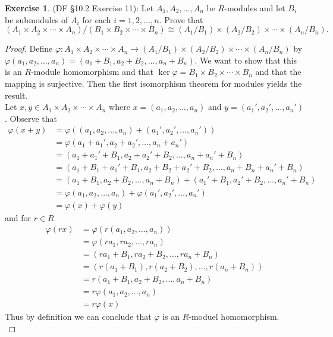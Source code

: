 \documentclass[8pt]{amsart}
\theoremstyle{plain}%
\theoremstyle{definition}
\newtheorem*{exercise}{Exercise}%
\theoremstyle{remark}
\numberwithin{equation}{section}
\begin{document}
\begin{exercise}
(DF \S 10.2 Exercise 11): Let $A_1, A_2, \ldots, A_n$ be $R$-modules and let $B_i$ be submodules of $A_i$ for each $i = 1, 2, \ldots, n$. Prove that $$(A_1 \times A_2 \times \cdots \times A_n)/(B_1 \times B_2 \times \cdots \times B_n) \cong (A_1/B_1) \times (A_2/B_2) \times \cdots \times (A_n/B_n).$$
	\begin{proof}
		Define $\varphi : A_1 \times A_2 \times \cdots \times A_n \to (A_1/B_1) \times (A_2/B_2) \times \cdots \times (A_n/B_n)$ by $\varphi(a_1, a_2, \ldots, a_n) = (a_1 + B_1, a_2 + B_2, \ldots, a_n + B_n)$. We want to show that this is an $R$-module homomorphism and that $\ker \varphi = B_1 \times B_2 \times \cdots \times B_n$ and that the mapping is surjective. Then the first isomorphism theorem for modules yields the result.\\

		Let $x, y \in A_1 \times A_2 \times \cdots \times A_n$ where $x = (a_1, a_2, \ldots, a_n)$ and $y = (a_1', a_2', \ldots, a_n')$. Observe that
		\begin{align*}
			\varphi(x + y) &= \varphi((a_1, a_2, \ldots, a_n) + (a_1', a_2', \ldots, a_n'))\\
			&= \varphi(a_1 + a_1', a_2 + a_2', \ldots, a_n + a_n')\\
			&= (a_1 + a_1' + B_1, a_2 + a_2' + B_2, \ldots, a_n + a_n' + B_n)\\
			&= (a_1 + B_1 + a_1' + B_1, a_2 + B_2 + a_2' + B_2, \ldots, a_n + B_n + a_n' + B_n)\\
			&= (a_1 + B_1, a_2 + B_2, \ldots, a_n + B_n) + (a_1' + B_1, a_2' + B_2, \ldots, a_n' + B_n)\\
			&= \varphi(a_1, a_2, \ldots, a_n) + \varphi(a_1', a_2', \ldots, a_n')\\
			&= \varphi(x) + \varphi(y)
		\end{align*}
		and for $r \in R$
		\begin{align*}
			\varphi(rx) &= \varphi(r(a_1, a_2, \ldots, a_n))\\
			&= \varphi(ra_1, ra_2, \ldots, ra_n)\\
			&= (ra_1 + B_1, ra_2 + B_2, \ldots, ra_n + B_n)\\
			&= (r(a_1 + B_1), r(a_2 + B_2), \ldots, r(a_n + B_n))\\
			&= r(a_1 + B_1, a_2 + B_2, \ldots, a_n + B_n)\\
			&= r\varphi(a_1, a_2, \ldots, a_n)\\
			&= r\varphi(x)
		\end{align*}
		Thus by definition we can conclude that $\varphi$ is an $R$-moduel homomorphism.\\


\end{proof}
\end{exercise}
\end{document}
